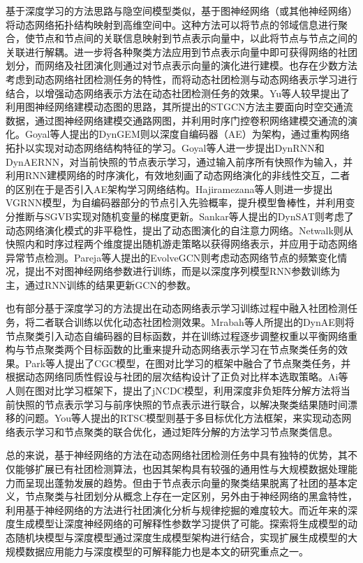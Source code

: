 基于深度学习的方法思路与隐空间模型类似，基于图神经网络（或其他神经网络）将动态网络拓扑结构映射到高维空间中。这种方法可以将节点的邻域信息进行聚合，使节点和节点间的关联信息映射到节点表示向量中，以此将节点与节点之间的关联进行解耦。进一步将各种聚类方法应用到节点表示向量中即可获得网络的社团划分，而网络及社团演化则通过对节点表示向量的演化进行建模。也存在少数方法考虑到动态网络社团检测任务的特性，而将动态社团检测与动态网络表示学习进行结合，以增强动态网络表示方法在动态社团检测任务的效果。Yu等人较早提出了利用图神经网络建模动态图的思路，其所提出的STGCN\cite{yu2017spatio}方法主要面向时空交通流数据，通过图神经网络建模交通路网图，并利用时序门控卷积网络建模交通流的演化。Goyal等人提出的DynGEM\cite{goyal2018dyngem}则以深度自编码器（AE）为架构，通过重构网络拓扑以实现对动态网络结构特征的学习。Goyal等人进一步提出DynRNN和DynAERNN\cite{goyal2020dyngraph2vec}，对当前快照的节点表示学习，通过输入前序所有快照作为输入，并利用RNN建模网络的时序演化，有效地刻画了动态网络演化的非线性交互，二者的区别在于是否引入AE架构学习网络结构。Hajiramezana等人则进一步提出VGRNN\cite{hajiramezanali2019variational}模型，为自编码器部分的节点引入先验概率，提升模型鲁棒性，并利用变分推断与SGVB实现对随机变量的梯度更新。Sankar等人提出的DynSAT\cite{sankar2018dynamic}则考虑了动态网络演化模式的非平稳性，提出了动态图演化的自注意力网络。Netwalk\cite{yu2018netwalk}则从快照内和时序过程两个维度提出随机游走策略以获得网络表示，并应用于动态网络异常节点检测。Pareja等人提出的EvolveGCN\cite{pareja2020evolvegcn}则考虑动态网络节点的频繁变化情况，提出不对图神经网络参数进行训练，而是以深度序列模型RNN参数训练为主，通过RNN训练的结果更新GCN的参数。

也有部分基于深度学习的方法提出在动态网络表示学习训练过程中融入社团检测任务，将二者联合训练以优化动态社团检测效果。Mrabah等人所提出的DynAE\cite{mrabah2019deep}则将节点聚类引入动态自编码器的目标函数，并在训练过程逐步调整权重以平衡网络重构与节点聚类两个目标函数的比重来提升动态网络表示学习在节点聚类任务的效果。Park等人\cite{park2022cgc}提出了CGC模型，在图对比学习的框架中融合了节点聚类任务，并根据动态网络同质性假设与社团的层次结构设计了正负对比样本选取策略。Ai等人\cite{10502242}则在图对比学习框架下，提出了jNCDC模型，利用深度非负矩阵分解方法将当前快照的节点表示学习与前序快照的节点表示进行联合，以解决聚类结果随时间漂移的问题。You等人\cite{you2021robust}提出的RTSC模型则基于多目标优化方法框架，来实现动态网络表示学习和节点聚类的联合优化，通过矩阵分解的方法学习节点聚类信息。

总的来说，基于神经网络的方法在动态网络社团检测任务中具有独特的优势，其不仅能够扩展已有社团检测算法，也因其架构具有较强的通用性与大规模数据处理能力而呈现出蓬勃发展的趋势。但由于节点表示向量的聚类结果脱离了社团的基本定义，节点聚类与社团划分从概念上存在一定区别，另外由于神经网络的黑盒特性，利用基于神经网络的方法进行社团演化分析与规律挖掘的难度较大。而近年来的深度生成模型让深度神经网络的可解释性参数学习提供了可能。探索将生成模型的动态随机块模型与深度模型通过深度生成模型架构进行结合，实现扩展生成模型的大规模数据应用能力与深度模型的可解释能力也是本文的研究重点之一。
